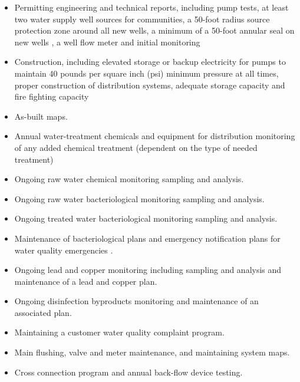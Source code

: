 \begin{itemize}

\item Permitting engineering and technical reports, including pump tests, at least two water supply well sources for communities, a 50-foot radius source protection zone around all new wells, a minimum of a 50-foot annular seal on new wells , a well flow meter and initial monitoring \\
\item  Construction, including elevated storage or backup electricity for pumps to maintain 40 pounds per square inch (psi) minimum pressure at all times, proper construction of distribution systems, adequate storage capacity and fire fighting capacity \\
\item  As-built maps.\\
\item  Annual water-treatment chemicals and equipment for distribution monitoring of any added chemical treatment (dependent on the type of needed treatment) \\
\item  Ongoing raw water chemical monitoring sampling and analysis. \\
\item  Ongoing raw water bacteriological monitoring sampling and analysis. \\
\item  Ongoing treated water bacteriological monitoring sampling and analysis.\\
\item  Maintenance of bacteriological plans and emergency notification plans for water quality emergencies . \\
\item  Ongoing lead and copper monitoring including sampling and analysis and maintenance of a lead and copper plan. \\
\item  Ongoing disinfection byproducts monitoring and maintenance of an associated plan.\\
\item  Maintaining a customer water quality complaint program.\\
\item  Main flushing, valve and meter maintenance, and maintaining system maps.\\
\item  Cross connection program and annual back-flow device testing.\\

\end{itemize}
